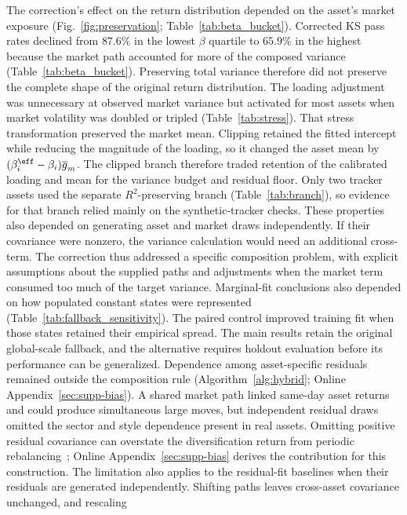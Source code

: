 The correction's effect on the return distribution depended on the
asset's market exposure (Fig.~\ref{fig:preservation};
Table~\ref{tab:beta_bucket}). Corrected KS pass rates declined from
$87.6\%$ in the lowest $\beta$ quartile to $65.9\%$ in the highest
because the market path accounted for more of the composed variance
(Table~\ref{tab:beta_bucket}). Preserving total variance therefore
did not preserve the complete shape of the original return
distribution. The loading adjustment was unnecessary at observed
market variance but activated for most assets when market volatility
was doubled or tripled (Table~\ref{tab:stress}). That stress
transformation preserved the market mean. Clipping retained the
fitted intercept while reducing the magnitude of the loading, so it
changed the asset mean by
$(\beta_i^{\eff}-\beta_i)\overline{g}_m$. The clipped branch therefore
traded retention of the calibrated loading and mean for the
variance budget and residual floor. Only two tracker
assets used the separate $R^2$-preserving branch
(Table~\ref{tab:branch}), so evidence for that branch relied mainly
on the synthetic-tracker checks. These properties also depended on
generating asset and market draws independently. If their covariance
were nonzero, the variance calculation would need an additional
cross-term. The correction thus addressed a specific composition
problem, with explicit assumptions about the supplied paths and
adjustments when the market term consumed too much of the target
variance.
Marginal-fit conclusions also depended on how populated constant
states were represented (Table~\ref{tab:fallback_sensitivity}). The paired control improved training fit
when those states retained their empirical spread. The main results
retain the original global-scale fallback, and the alternative
requires holdout evaluation before its performance can be generalized.
Dependence among asset-specific residuals remained outside the
composition rule (Algorithm~\ref{alg:hybrid}; Online
Appendix~\ref{sec:supp-bias}). A shared market path linked same-day asset returns and
could produce simultaneous large moves, but independent residual
draws omitted the sector and style dependence present in real assets.
Omitting positive residual covariance can overstate the diversification
return from periodic rebalancing~\cite{boothFama1992,
boucheyNemtchinovWong2015, markowitz1976longRun}; Online
Appendix~\ref{sec:supp-bias} derives the contribution for this
construction. The limitation also applies to the residual-fit
baselines when their residuals are generated independently. Shifting
paths leaves cross-asset covariance unchanged, and rescaling
